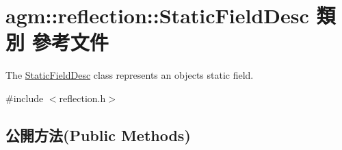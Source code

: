\hypertarget{classagm_1_1reflection_1_1_static_field_desc}{}\section{agm\+:\+:reflection\+:\+:Static\+Field\+Desc 類別 參考文件}
\label{classagm_1_1reflection_1_1_static_field_desc}


The \hyperlink{classagm_1_1reflection_1_1_static_field_desc}{Static\+Field\+Desc} class represents an object\textquotesingle{}s static field.  




{\ttfamily \#include $<$reflection.\+h$>$}

\subsection*{公開方法(Public Methods)}
